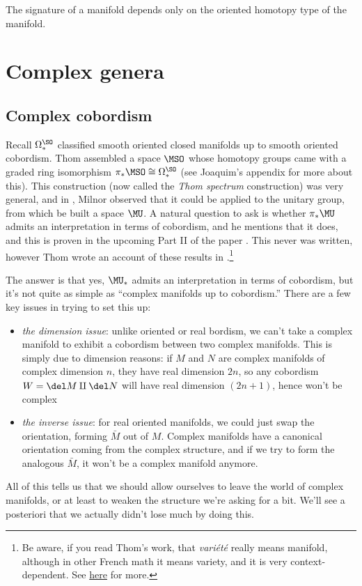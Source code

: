 \documentclass[11pt]{book}
\begin{document}
\begin{corollary} The signature of a manifold depends only on the oriented homotopy type of the manifold.
\end{corollary}


\section{Complex genera}

\subsection{Complex cobordism}


Recall $\Omega^\SO_\ast$ classified smooth oriented closed manifolds up to smooth oriented cobordism. Thom assembled a space $\MSO$ whose homotopy groups came with a graded ring isomorphism $\pi_\ast\MSO \cong \Omega^\SO_\ast$ \cite{thomQuelquesProprietesGlobales1954} (see Joaquim's appendix for more about this). This construction (now called the \emph{Thom spectrum} construction) was very general, and in \cite{milnorCobordismRingOmega1960}, Milnor observed that it could be applied to the unitary group, from which be built a space $\MU$. A natural question to ask is whether $\pi_\ast \MU$ admits an interpretation in terms of cobordism, and he mentions that it does, and this is proven in the upcoming Part II of the paper \cite{milnorCobordismRingOmega1960}. This never was written, however Thom wrote an account of these results in \cite[\S5]{thomTravauxMilnorCobordisme1958}.\footnote{Be aware, if you read Thom's work, that \emph{vari\'et\'e} really means manifold, although in other French math it means variety, and it is very context-dependent. See \href{https://reyssat.users.lmno.cnrs.fr/dico/dicofa.html}{here} for more.}

The answer is that yes, $\MU_\ast$ admits an interpretation in terms of cobordism, but it's not quite as simple as ``complex manifolds up to cobordism.'' There are a few key issues in trying to set this up:
\begin{itemize}
    \item \emph{the dimension issue}: unlike oriented or real bordism, we can't take a complex manifold to exhibit a cobordism between two complex manifolds. This is simply due to dimension reasons: if $M$ and $N$ are complex manifolds of complex dimension $n$, they have real dimension $2n$, so any cobordism $W = \del M \amalg \del N$ will have real dimension $(2n+1)$, hence won't be complex
    \item \emph{the inverse issue}: for real oriented manifolds, we could just swap the orientation, forming $\bar{M}$ out of $M$. Complex manifolds have a canonical orientation coming from the complex structure, and if we try to form the analogous $\bar{M}$, it won't be a complex manifold anymore.
\end{itemize}
All of this tells us that we should allow ourselves to leave the world of complex manifolds, or at least to weaken the structure we're asking for a bit. We'll see a posteriori that we actually didn't lose much by doing this.
\end{document}
